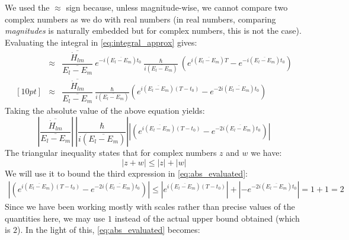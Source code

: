 \documentclass[12pt,a4paper]{article}
\begin{document}
	We used the $\approx$ sign because, unless magnitude-wise, we cannot compare two complex numbers as we do with real numbers (in real numbers, comparing \emph{magnitudes} is naturally embedded but for complex numbers, this is not the case). Evaluating the integral in \eqref{eq:integral_approx} gives:
	\begin{eqnarray}
		&\approx& \dfrac{\overline{\dot{H}_{lm}}}{\overline{E_{l} - E_{m}}}\ e^{-i \left( \overline{E_{l} - E_{m}} \right) t_{0}}\ \frac{\hbar}{i \left( \overline{E_{l} - E_{m}} \right)}\ \left( e^{i \left( \overline{E_{l} - E_{m}} \right) T} - e^{-i \left( \overline{E_{l} - E_{m}} \right) t_{0}} \right) \nonumber\\ [10pt]
		&\approx& \dfrac{\overline{\dot{H}_{lm}}}{\overline{E_{l} - E_{m}}}\ \frac{\hbar}{i \left( \overline{E_{l} - E_{m}} \right)} \left( e^{i \left( \overline{E_{l} - E_{m}} \right) \left(T - t_{0}\right)} - e^{-2i \left( \overline{E_{l} - E_{m}} \right) t_{0}} \right)
		\label{eq:evaluated_integral}
	\end{eqnarray}	
	Taking the absolute value of the above equation yields:
	\begin{equation}
		\left| \dfrac{\overline{\dot{H}_{lm}}}{\overline{E_{l} - E_{m}}} \right|\ \left| \frac{\hbar}{i \left( \overline{E_{l} - E_{m}} \right)} \right| \left| \left( e^{i \left( \overline{E_{l} - E_{m}} \right) \left(T - t_{0}\right)} - e^{-2i \left( \overline{E_{l} - E_{m}} \right) t_{0}} \right) \right|
		\label{eq:abs_evaluated}
	\end{equation} 
	The triangular inequality states that for complex numbers $z$ and $w$ we have:
	\begin{equation}
		\left| z + w \right| \leq \left|z\right| + \left|w\right|
		\label{eq:triangle_inequality}
	\end{equation} 
	We will use it to bound the third expression in \eqref{eq:abs_evaluated}:
	\begin{align}
		\left| \left( e^{i \left( \overline{E_{l} - E_{m}} \right) \left(T - t_{0}\right)} - e^{-2i \left( \overline{E_{l} - E_{m}} \right) t_{0}} \right) \right| \leq \left| e^{i \left( \overline{E_{l} - E_{m}} \right) \left(T - t_{0}\right)} \right| + \left|- e^{-2i \left( \overline{E_{l} - E_{m}} \right) t_{0}} \right| = 1 + 1 = 2
		\label{eq:bound_exponential}
	\end{align}
	Since we have been working mostly with scales rather than precise values of the quantities here, we may use $1$ instead of the actual upper bound obtained (which is $2$). In the light of this, \eqref{eq:abs_evaluated} becomes:
\end{document}
